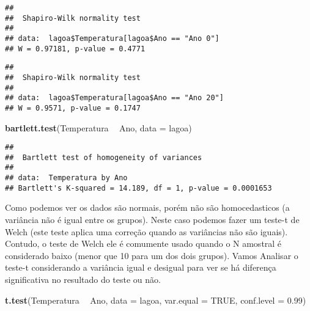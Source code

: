 \documentclass[]{book}
\newenvironment{Shaded}{\begin{snugshade}}{\end{snugshade}}
\newcommand{\DataTypeTok}[1]{\textcolor[rgb]{0.13,0.29,0.53}{#1}}
\newcommand{\FloatTok}[1]{\textcolor[rgb]{0.00,0.00,0.81}{#1}}
\newcommand{\KeywordTok}[1]{\textcolor[rgb]{0.13,0.29,0.53}{\textbf{#1}}}
\newcommand{\NormalTok}[1]{#1}
\newcommand{\OperatorTok}[1]{\textcolor[rgb]{0.81,0.36,0.00}{\textbf{#1}}}
\newcommand{\OtherTok}[1]{\textcolor[rgb]{0.56,0.35,0.01}{#1}}
\newcommand{\StringTok}[1]{\textcolor[rgb]{0.31,0.60,0.02}{#1}}
\begin{document}
\begin{verbatim}
## 
##  Shapiro-Wilk normality test
## 
## data:  lagoa$Temperatura[lagoa$Ano == "Ano 0"]
## W = 0.97181, p-value = 0.4771
\end{verbatim}

\begin{Shaded}
\end{Shaded}

\begin{verbatim}
## 
##  Shapiro-Wilk normality test
## 
## data:  lagoa$Temperatura[lagoa$Ano == "Ano 20"]
## W = 0.9571, p-value = 0.1747
\end{verbatim}

\begin{Shaded}
\begin{Highlighting}[]
\KeywordTok{bartlett.test}\NormalTok{(Temperatura }\OperatorTok{~}\StringTok{ }\NormalTok{Ano, }\DataTypeTok{data =}\NormalTok{ lagoa)}
\end{Highlighting}
\end{Shaded}

\begin{verbatim}
## 
##  Bartlett test of homogeneity of variances
## 
## data:  Temperatura by Ano
## Bartlett's K-squared = 14.189, df = 1, p-value = 0.0001653
\end{verbatim}

Como podemos ver os dados são normais, porém não são homocedasticos (a variância não é igual entre os grupos). Neste caso podemos fazer um teste-t de Welch (este teste aplica uma correção quando as variâncias não são iguais). Contudo, o teste de Welch ele é comumente usado quando o N amostral é considerado baixo (menor que 10 para um dos dois grupos). Vamos Analisar o teste-t considerando a variância igual e desigual para ver se há diferença significativa no resultado do teste ou não.

\begin{Shaded}
\begin{Highlighting}[]
\KeywordTok{t.test}\NormalTok{(Temperatura }\OperatorTok{~}\StringTok{ }\NormalTok{Ano, }
       \DataTypeTok{data =}\NormalTok{ lagoa,}
       \DataTypeTok{var.equal =} \OtherTok{TRUE}\NormalTok{,}
       \DataTypeTok{conf.level =} \FloatTok{0.99}\NormalTok{)}
\end{Highlighting}
\end{Shaded}
\end{document}
